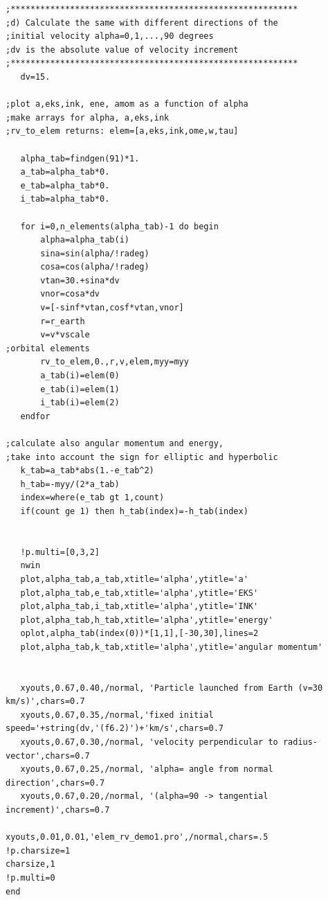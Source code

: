 \documentclass[a4paper,12pt]{article}
\def\black{\color{RGBblack}}
\begin{document}
{{{{\begin{verbatim}
;**********************************************************
;d) Calculate the same with different directions of the
;initial velocity alpha=0,1,...,90 degrees
;dv is the absolute value of velocity increment
;**********************************************************
   dv=15.

;plot a,eks,ink, ene, amom as a function of alpha
;make arrays for alpha, a,eks,ink
;rv_to_elem returns: elem=[a,eks,ink,ome,w,tau]

   alpha_tab=findgen(91)*1.
   a_tab=alpha_tab*0.
   e_tab=alpha_tab*0.
   i_tab=alpha_tab*0.

   for i=0,n_elements(alpha_tab)-1 do begin
       alpha=alpha_tab(i)
       sina=sin(alpha/!radeg)
       cosa=cos(alpha/!radeg)
       vtan=30.+sina*dv
       vnor=cosa*dv
       v=[-sinf*vtan,cosf*vtan,vnor]
       r=r_earth
       v=v*vscale
;orbital elements
       rv_to_elem,0.,r,v,elem,myy=myy
       a_tab(i)=elem(0)
       e_tab(i)=elem(1)
       i_tab(i)=elem(2)
   endfor
   
;calculate also angular momentum and energy, 
;take into account the sign for elliptic and hyperbolic
   k_tab=a_tab*abs(1.-e_tab^2)   
   h_tab=-myy/(2*a_tab)
   index=where(e_tab gt 1,count)
   if(count ge 1) then h_tab(index)=-h_tab(index)
   

   !p.multi=[0,3,2]
   nwin   
   plot,alpha_tab,a_tab,xtitle='alpha',ytitle='a'
   plot,alpha_tab,e_tab,xtitle='alpha',ytitle='EKS'
   plot,alpha_tab,i_tab,xtitle='alpha',ytitle='INK'
   plot,alpha_tab,h_tab,xtitle='alpha',ytitle='energy'
   oplot,alpha_tab(index(0))*[1,1],[-30,30],lines=2
   plot,alpha_tab,k_tab,xtitle='alpha',ytitle='angular momentum'
   

   xyouts,0.67,0.40,/normal, 'Particle launched from Earth (v=30 km/s)',chars=0.7
   xyouts,0.67,0.35,/normal,'fixed initial speed='+string(dv,'(f6.2)')+'km/s',chars=0.7
   xyouts,0.67,0.30,/normal, 'velocity perpendicular to radius-vector',chars=0.7
   xyouts,0.67,0.25,/normal, 'alpha= angle from normal direction',chars=0.7
   xyouts,0.67,0.20,/normal, '(alpha=90 -> tangential increment)',chars=0.7
   
xyouts,0.01,0.01,'elem_rv_demo1.pro',/normal,chars=.5
!p.charsize=1
charsize,1
!p.multi=0
end

\end{verbatim}
\black}

}}}
\end{document}

